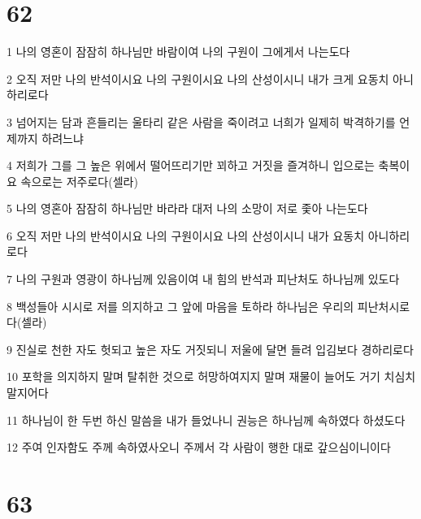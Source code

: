 \chapter{62}

\par 1 나의 영혼이 잠잠히 하나님만 바람이여 나의 구원이 그에게서 나는도다
\par 2 오직 저만 나의 반석이시요 나의 구원이시요 나의 산성이시니 내가 크게 요동치 아니하리로다
\par 3 넘어지는 담과 흔들리는 울타리 같은 사람을 죽이려고 너희가 일제히 박격하기를 언제까지 하려느냐
\par 4 저희가 그를 그 높은 위에서 떨어뜨리기만 꾀하고 거짓을 즐겨하니 입으로는 축복이요 속으로는 저주로다(셀라)
\par 5 나의 영혼아 잠잠히 하나님만 바라라 대저 나의 소망이 저로 좇아 나는도다
\par 6 오직 저만 나의 반석이시요 나의 구원이시요 나의 산성이시니 내가 요동치 아니하리로다
\par 7 나의 구원과 영광이 하나님께 있음이여 내 힘의 반석과 피난처도 하나님께 있도다
\par 8 백성들아 시시로 저를 의지하고 그 앞에 마음을 토하라 하나님은 우리의 피난처시로다(셀라)
\par 9 진실로 천한 자도 헛되고 높은 자도 거짓되니 저울에 달면 들려 입김보다 경하리로다
\par 10 포학을 의지하지 말며 탈취한 것으로 허망하여지지 말며 재물이 늘어도 거기 치심치 말지어다
\par 11 하나님이 한 두번 하신 말씀을 내가 들었나니 권능은 하나님께 속하였다 하셨도다
\par 12 주여 인자함도 주께 속하였사오니 주께서 각 사람이 행한 대로 갚으심이니이다

\chapter{63}

